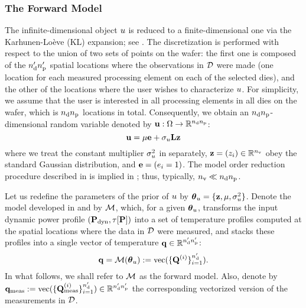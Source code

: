 \subsubsection{The Forward Model} 
The infinite-dimensional object $u$ is reduced to a finite-dimensional one via the Karhunen-Lo\`{e}ve (KL) expansion; see . The discretization is performed with respect to the union of two sets of points on the wafer: the first one is composed of the ${n_\text{d}'} {n_\text{p}'}$ spatial locations where the observations in $\mathcal{D}$ were made (one location for each measured processing element on each of the selected dies), and the other of the locations where the user wishes to characterize $u$. For simplicity, we assume that the user is interested in all processing elements in all dies on the wafer, which is ${n_\text{d}} {n_\text{p}}$ locations in total. Consequently, we obtain an ${n_\text{d}} {n_\text{p}}$-dimensional random variable denoted by $\mathbf{u}: \Omega \to \mathbb{R}^{{n_\text{d}} {n_\text{p}}}$:
\begin{equation} \elabel{kl-approximation}
  \vu = \mu \vI + \sigma_\u \mKL \vz
\end{equation}
where we treat the constant multiplier $\sigma^2_u$ in  separately, $\mathbf{z} = (z_i) \in \mathbb{R}^{n_\text{v}}$ obey the standard Gaussian distribution, and $\mathbf{e} = (e_i = 1)$. The model order reduction procedure described in  is implied in ; thus, typically, ${n_\text{v}} \ll {n_\text{d}} {n_\text{p}}$.

Let us redefine the parameters of the prior of $u$ by ${\boldsymbol\theta}_u = \{ \mathbf{z}, \mu, \sigma^2_u \}$.
Denote the model developed in  and  by $\model$, which, for a given ${\boldsymbol\theta}_u$, transforms the input dynamic power profile $(\mathbf{P}_{\text{dyn}}, \tau[\mathbf{P}])$ into a set of temperature profiles computed at the spatial locations where the data in $\mathcal{D}$ were measured, and stacks these profiles into a single vector of temperature $\mathbf{q} \in \mathbb{R}^{{n_\text{d}'} {n_\text{p}'}}$:
\begin{equation} \elabel{model}
  \mvT = \model{\vparam_\u} := \vectorize{\{\mT^{(i)}\}_{i = 1}^\nrdies}.
\end{equation}
In what follows, we shall refer to $\model$ as the forward model. Also, denote by $\mathbf{q}_{\text{meas}} := \text{vec}(\{\mathbf{Q}^{(i)}_{\text{meas}}\}_{i = 1}^{n_\text{d}'}) \in \mathbb{R}^{{n_\text{d}'} {n_\text{p}'}}$ the corresponding vectorized version of the measurements in $\mathcal{D}$.

